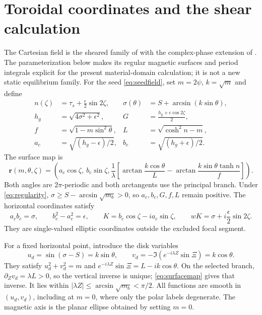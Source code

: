 \documentclass[11pt,a4paper]{article}
\theoremstyle{remark}\newtheorem{remark}{Remark}
\numberwithin{equation}{section}
\begin{document}
\section{Toroidal coordinates and the shear calculation}\label{app:geometry}
The Cartesian field is the sheared family of \citet{Landreman} with the complex-phase extension of \citet{Issan}. The parameterization below makes its regular magnetic surfaces and period integrals explicit for the present material-domain calculation; it is not a new static equilibrium family. For the seed \eqref{eq:seedfield}, set $m=2\psi$, $k=\sqrt m$ and define
\begin{equation}
\begin{aligned}
n(\zeta)&=\tau_s+\frac\epsilon2\sin2\zeta,&
\sigma(\theta)&=S+\arcsin(k\sin\theta),\\
h_g&=\sqrt{4\sigma^2+\epsilon^2},&
G&=\frac{h_g+\epsilon\cos2\zeta}{2},\\
f&=\sqrt{1-m\sin^2\theta},&
L&=\sqrt{\cosh^2n-m},\\
a_c&=\sqrt{(h_g-\epsilon)/2},&
b_c&=\sqrt{(h_g+\epsilon)/2}.
\end{aligned}
\label{eq:mapfunctions}
\end{equation}
The surface map is
\begin{equation}
\boldsymbol r(m,\theta,\zeta)=
\left(a_c\cos\zeta,\ b_c\sin\zeta,
\frac1\lambda\left[
\arctan\frac{k\cos\theta}{L}
-\arctan\frac{k\sin\theta\tanh n}{f}\right]\right).
\label{eq:surfacemap}
\end{equation}
Both angles are $2\pi$-periodic and both arctangents use the principal branch. Under \eqref{eq:regularity}, $\sigma\ge S-\arcsin\sqrt{m_b}>0$, so $a_c,b_c,G,f,L$ remain positive. The horizontal coordinates satisfy
\begin{equation}
a_cb_c=\sigma,\qquad b_c^2-a_c^2=\epsilon,\qquad
K=b_c\cos\zeta-i a_c\sin\zeta,\qquad
wK=\sigma+i\frac\epsilon2\sin2\zeta.
\label{eq:ellipticidentities}
\end{equation}
They are single-valued elliptic coordinates outside the excluded focal segment.

For a fixed horizontal point, introduce the disk variables
\[
u_d=\sin(\sigma-S)=k\sin\theta,
\qquad v_d=-\Im(e^{-i\lambda Z}\sin\Xi)=k\cos\theta.
\]
They satisfy $u_d^2+v_d^2=m$ and $e^{-i\lambda Z}\sin\Xi=L-ik\cos\theta$. On the selected branch, $\partial_Zv_d=\lambda L>0$, so the vertical inverse is unique; \eqref{eq:surfacemap} gives that inverse. It lies within $|\lambda Z|\le\arcsin\sqrt{m_b}<\pi/2$. All functions are smooth in $(u_d,v_d)$, including at $m=0$, where only the polar labels degenerate. The magnetic axis is the planar ellipse obtained by setting $m=0$.
\end{document}
